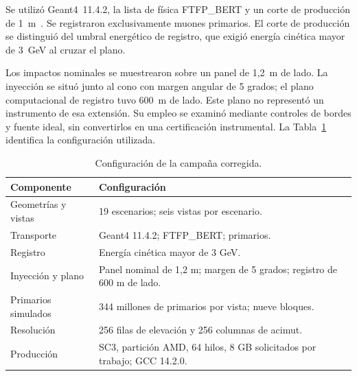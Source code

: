 Se utilizó Geant4~11.4.2, la lista de física FTFP\_BERT y un corte de producción de 1~m~\parencite{agostinelli2003,allison2016}. Se registraron exclusivamente muones primarios. El corte de producción se distinguió del umbral energético de registro, que exigió energía cinética mayor de 3~GeV al cruzar el plano.

Los impactos nominales se muestrearon sobre un panel de 1,2~m de lado. La inyección se situó junto al cono con margen angular de 5 grados; el plano computacional de registro tuvo 600~m de lado. Este plano no representó un instrumento de esa extensión. Su empleo se examinó mediante controles de bordes y fuente ideal, sin convertirlos en una certificación instrumental. La Tabla~\ref{tab:met-receta} identifica la configuración utilizada.
\begin{table}[htbp]\centering\small
\caption{Configuración de la campaña corregida.}\label{tab:met-receta}
\begin{tabularx}{\linewidth}{@{}p{4.7cm}X@{}}\toprule
Componente & Configuración\\\midrule
Geometrías y vistas & 19 escenarios; seis vistas por escenario.\\
Transporte & Geant4 11.4.2; FTFP\_BERT; primarios.\\
Registro & Energía cinética mayor de 3 GeV.\\
Inyección y plano & Panel nominal de 1,2 m; margen de 5 grados; registro de 600 m de lado.\\
Primarios simulados & 344 millones de primarios por vista; nueve bloques.\\
Resolución & 256 filas de elevación y 256 columnas de acimut.\\
Producción & SC3, partición AMD, 64 hilos, 8 GB solicitados por trabajo; GCC 14.2.0.\\\bottomrule
\end{tabularx}\end{table}

